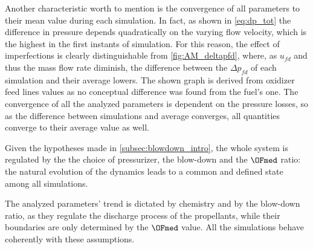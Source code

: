 
Another characteristic worth to mention is the convergence of all parameters to their mean value during each simulation.
In fact, as shown in \autoref{eq:dp_tot} the difference in pressure depends quadratically on the varying flow velocity, which is the highest in the first instants of simulation.
For this reason, the effect of imperfections is clearly distinguishable from \autoref{fig:AM_deltapfd}, where, as $u_{fd}$ and thus the mass flow rate diminish, the difference between the $\Delta p_{fd}$ of each simulation and their average lowers. The shown graph is derived from oxidizer feed lines values as no conceptual difference was found from the fuel's one. The convergence of all the analyzed parameters is dependent on the pressure losses, so as the difference between simulations and average converges, all quantities converge to their average value as well.

Given the hypotheses made in \autoref{subsec:blowdown_intro}, the whole system is regulated by the the choice of pressurizer, the blow-down and the $\OFmed$ ratio: the natural evolution of the dynamics leads to a common and defined state among all simulations.

The analyzed parameters' trend is dictated by chemistry and by the blow-down ratio, as they regulate the discharge process of the propellants, while their boundaries are only determined by the $\OFmed$ value. All the simulations behave coherently  with these assumptions. 











